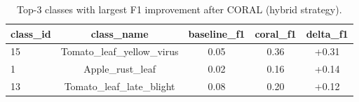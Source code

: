 \begin{table}[htbp]
\caption{Top-3 classes with largest F1 improvement after CORAL (hybrid strategy).}
\label{tab:perclass_top3}
\begin{tabular}{lcccc}
\toprule
class\_id & class\_name & baseline\_f1 & coral\_f1 & delta\_f1 \\
\midrule
15 & Tomato\_leaf\_yellow\_virus & 0.05 & 0.36 & +0.31 \\
1 & Apple\_rust\_leaf & 0.02 & 0.16 & +0.14 \\
13 & Tomato\_leaf\_late\_blight & 0.08 & 0.20 & +0.12 \\
\bottomrule
\end{tabular}
\end{table}
